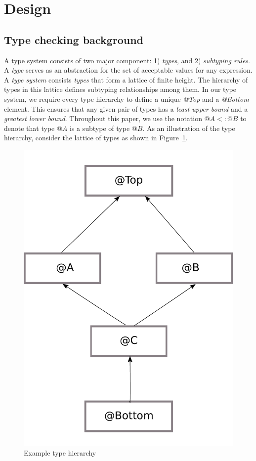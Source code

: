 \section{Design}
\subsection{Type checking background}
A type system consists of two major component: 1) \textit{types}, and 2) \textit{subtyping rules}.
A \textit{type} serves as an abstraction for the set of acceptable values for any expression. A \textit{type system} consists
\textit{types} that form a lattice of finite height. The hierarchy of types in this lattice defines subtyping relationships among them.
In our type system, we require every type hierarchy to define a unique \textit{@Top} and a \textit{@Bottom} element. This ensures that
any given pair of types has a \textit{least upper bound} and a \textit{greatest lower bound}.
Throughout this paper, we use the notation $@A <: @B$ to denote that type $@A$ is a subtype of type $@B$.
As an illustration of the type hierarchy, consider the lattice of types as shown in Figure~\ref{fig-example-lattice}.

\begin{figure}
	\begin{center}
		\includegraphics[scale=0.15]{lattice}
	\end{center}
	\caption{Example type hierarchy}
	\label{fig-example-lattice}
\end{figure}

